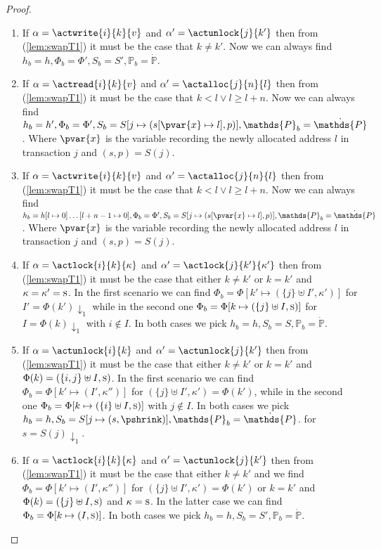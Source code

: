 \begin{lem}
\begin{proof}
\begin{enumerate}[label=({\roman*})]
		\item If $\alpha = \actwrite{i}{k}{v}$ and $\alpha' = \actunlock{j}{k'}$ then from (\ref{lem:swapT1}) it must be the case that $k \neq k'$. Now we can always find $h_b = h, \Phi_b = \Phi', S_b = S', \mathds{P}_b = \dot{\mathds{P}}$.
		
		\item If $\alpha = \actread{i}{k}{v}$ and $\alpha' = \actalloc{j}{n}{l}$ then from (\ref{lem:swapT1}) it must be the case that $k < l \lor l \geq l + n$. Now we can always find $h_b = h', \Phi_b = \Phi', S_b = S[j \mapsto (s[\pvar{x} \mapsto l], p)], \mathds{P}_b = \dot{\mathds{P}}$. Where $\pvar{x}$ is the variable recording the newly allocated address $l$ in transaction $j$ and $(s, p) = S(j)$.
		
		\item If $\alpha = \actwrite{i}{k}{v}$ and $\alpha' = \actalloc{j}{n}{l}$ then from (\ref{lem:swapT1}) it must be the case that $k < l \lor l \geq l + n$. Now we can always find $h_b = h[l \mapsto 0]\ldots[l + n - 1 \mapsto 0], \Phi_b = \Phi', S_b = S[j \mapsto (s[\pvar{x} \mapsto l], p)], \mathds{P}_b = \dot{\mathds{P}}$. Where $\pvar{x}$ is the variable recording the newly allocated address $l$ in transaction $j$ and $(s, p) = S(j)$.
		
		\item If $\alpha = \actlock{i}{k}{\kappa}$ and $\alpha' = \actlock{j}{k'}{\kappa'}$ then from (\ref{lem:swapT1}) it must be the case that either $k \neq k'$ or $k = k'$ and $\kappa = \kappa' = \textsc{s}$. In the first scenario we can find $\Phi_b = \Phi[k' \mapsto (\{j\} \uplus I', \kappa')]$ for $I' = \Phi(k') \downarrow_1$ while in the second one $\Phi_b = \Phi[k \mapsto (\{j\} \uplus I, \textsc{s})]$ for $I = \Phi(k) \downarrow_1$ with $i \not\in I$. In both cases we pick $h_b = h, S_b = S, \mathds{P}_b = \dot{\mathds{P}}$.
		
		\item If $\alpha = \actunlock{i}{k}$ and $\alpha' = \actunlock{j}{k'}$ then from (\ref{lem:swapT1}) it must be the case that either $k \neq k'$ or $k = k'$ and $\Phi(k) = (\{i, j\} \uplus I, \textsc{s})$. In the first scenario we can find $\Phi_b = \Phi[k' \mapsto (I', \kappa'')]$ for $(\{j\} \uplus I', \kappa') = \Phi(k')$, while in the second one $\Phi_b = \Phi[k \mapsto (\{i\} \uplus I, \textsc{s})]$ with $j \not\in I$. In both cases we pick $h_b = h, S_b = S[j \mapsto (s, \pshrink)], \mathds{P}_b = \dot{\mathds{P}}$. for $s = S(j) \downarrow_1$.
		
		\item If $\alpha = \actlock{i}{k}{\kappa}$ and $\alpha' = \actunlock{j}{k'}$ then from (\ref{lem:swapT1}) it must be the case that either $k \neq k'$ and we find $\Phi_b = \Phi[k' \mapsto (I', \kappa'')]$ for $(\{j\} \uplus I', \kappa') = \Phi(k')$ or $k = k'$ and $\Phi(k) = (\{j\} \uplus I, \textsc{s})$ and $\kappa = \textsc{s}$. In the latter case we can find $\Phi_b = \Phi[k \mapsto (I, \textsc{s})]$. In both cases we pick $h_b = h, S_b = S', \mathds{P}_b = \dot{\mathds{P}}$.
		

\end{enumerate}
\end{proof}
\end{lem}
